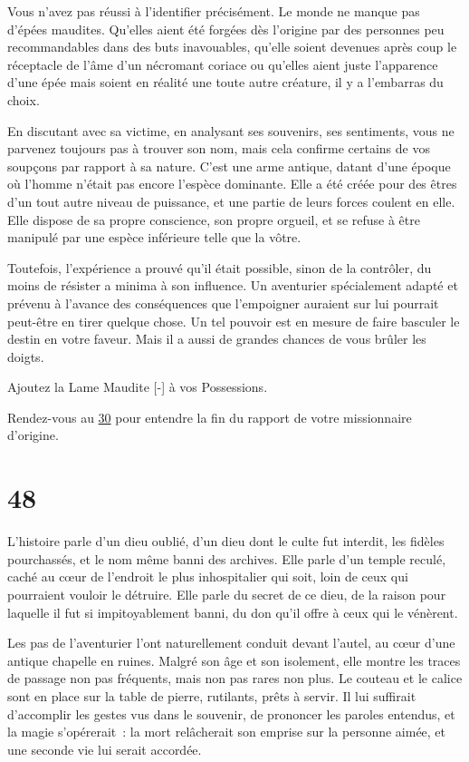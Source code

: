\documentclass{report}
\newcommand{\gsection}[1]{
    \section{#1}
    \label{section-#1}
}
\newcommand{\glink}[1]{\hyperref[section-#1]{#1}}
\begin{document}
Vous n'avez pas réussi à l'identifier précisément. Le monde ne manque pas d'épées maudites. Qu'elles aient été forgées dès l'origine par des personnes peu recommandables dans des buts inavouables, qu'elle soient devenues après coup le réceptacle de l'âme d'un nécromant coriace ou qu'elles aient juste l'apparence d'une épée mais soient en réalité une toute autre créature, il y a l'embarras du choix.

En discutant avec sa victime, en analysant ses souvenirs, ses sentiments, vous ne parvenez toujours pas à trouver son nom, mais cela confirme certains de vos soupçons par rapport à sa nature. C'est une arme antique, datant d'une époque où l'homme n'était pas encore l'espèce dominante. Elle a été créée pour des êtres d'un tout autre niveau de puissance, et une partie de leurs forces coulent en elle. Elle dispose de sa propre conscience, son propre orgueil, et se refuse à être manipulé par une espèce inférieure telle que la vôtre.

Toutefois, l'expérience a prouvé qu'il était possible, sinon de la contrôler, du moins de résister a minima à son influence. Un aventurier spécialement adapté et prévenu à l'avance des conséquences que l'empoigner auraient sur lui pourrait peut-être en tirer quelque chose. Un tel pouvoir est en mesure de faire basculer le destin en votre faveur. Mais il a aussi de grandes chances de vous brûler les doigts.

Ajoutez la Lame Maudite [-] à vos Possessions.

Rendez-vous au \glink{30} pour entendre la fin du rapport de votre missionnaire d'origine.

\gsection{48}

L'histoire parle d'un dieu oublié, d'un dieu dont le culte fut interdit, les fidèles pourchassés, et le nom même banni des archives. Elle parle d'un temple reculé, caché au cœur de l'endroit le plus inhospitalier qui soit, loin de ceux qui pourraient vouloir le détruire. Elle parle du secret de ce dieu, de la raison pour laquelle il fut si impitoyablement banni, du don qu'il offre à ceux qui le vénèrent.

Les pas de l'aventurier l'ont naturellement conduit devant l'autel, au cœur d'une antique chapelle en ruines. Malgré son âge et son isolement, elle montre les traces de passage non pas fréquents, mais non pas rares non plus. Le couteau et le calice sont en place sur la table de pierre, rutilants, prêts à servir. Il lui suffirait d'accomplir les gestes vus dans le souvenir, de prononcer les paroles entendus, et la magie s'opérerait : la mort relâcherait son emprise sur la personne aimée, et une seconde vie lui serait accordée.
\end{document}
